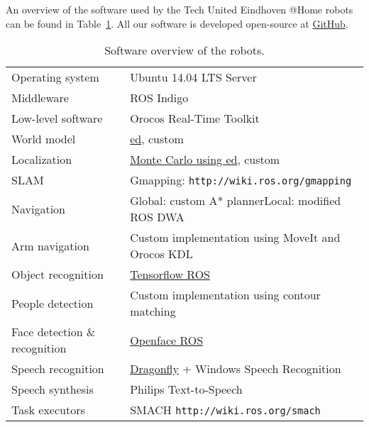 An overview of the software used by the Tech United Eindhoven @Home robots can be found in Table~\ref{tab:softwarespec}.
All our software is developed open-source at \href{https://github.com/tue-robotics}{GitHub}.
\begin{table}[h]
    \begin{center}
    \caption{Software overview of the robots.}
    \label{tab:softwarespec}
    \renewcommand{\arraystretch}{1.0}
    \setlength{\tabcolsep}{5pt}
        \begin{tabular}{p{} p{}}
        	\toprule
            Operating system & Ubuntu 14.04 LTS Server\\

            Middleware & ROS Indigo \\

            Low-level software & Orocos Real-Time Toolkit\\

            World model & \href{https://github.com/tue-robotics/ed}{\acrfull{ed}}, custom \\

            Localization & \href{https://github.com/tue-robotics/ed_localization}{Monte Carlo using \gls{ed}}, custom \\

            SLAM & Gmapping: \texttt{http://wiki.ros.org/gmapping}\\

            Navigation & Global: custom A* planner\newline Local: modified ROS DWA \\

            Arm navigation & Custom implementation using MoveIt and Orocos KDL\\

            Object recognition & \href{https://github.com/tue-robotics/image_recognition/tree/master/tensorflow_ros}{Tensorflow ROS} \\

            People detection & Custom implementation using contour matching \\
            Face detection \& recognition & \href{https://github.com/tue-robotics/image_recognition/tree/master/openface_ros}{Openface ROS} \\
            Speech recognition & \href{http://code.google.com/p/dragonfly/}{Dragonfly} + Windows Speech Recognition\\
            Speech synthesis & Philips Text-to-Speech\\
            Task executors & SMACH \texttt{http://wiki.ros.org/smach}\\
            \bottomrule
        \end{tabular}
    \end{center}
\end{table}
